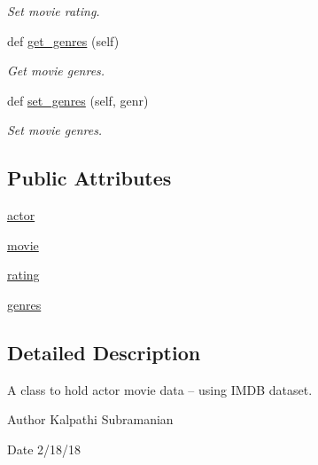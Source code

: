 \begin{DoxyCompactItemize}
\begin{DoxyCompactList}\small\item\em Set movie rating. \end{DoxyCompactList}\item 
def \hyperlink{class_bridges_1_1data__src__dependent_1_1_actor_movie_i_m_d_b_1_1_actor_movie_i_m_d_b_ad98818bbfe9d29c5c4f6ef63ccf4bbd8}{get\+\_\+genres} (self)
\begin{DoxyCompactList}\small\item\em Get movie genres. \end{DoxyCompactList}\item 
def \hyperlink{class_bridges_1_1data__src__dependent_1_1_actor_movie_i_m_d_b_1_1_actor_movie_i_m_d_b_a238451601df5b0072075f55c318e2a8d}{set\+\_\+genres} (self, genr)
\begin{DoxyCompactList}\small\item\em Set movie genres. \end{DoxyCompactList}\end{DoxyCompactItemize}
\subsection*{Public Attributes}
\begin{DoxyCompactItemize}
\item 
\hyperlink{class_bridges_1_1data__src__dependent_1_1_actor_movie_i_m_d_b_1_1_actor_movie_i_m_d_b_a84e73e799555925cb46d9db91724a93e}{actor}
\item 
\hyperlink{class_bridges_1_1data__src__dependent_1_1_actor_movie_i_m_d_b_1_1_actor_movie_i_m_d_b_a07aa8e1726948fa805165497eb9b4c8c}{movie}
\item 
\hyperlink{class_bridges_1_1data__src__dependent_1_1_actor_movie_i_m_d_b_1_1_actor_movie_i_m_d_b_aa6b0a5eefa9dd1d2e3734cebcad53773}{rating}
\item 
\hyperlink{class_bridges_1_1data__src__dependent_1_1_actor_movie_i_m_d_b_1_1_actor_movie_i_m_d_b_a9c781e2b62bd3bca8957795b54648c89}{genres}
\end{DoxyCompactItemize}


\subsection{Detailed Description}
A class to hold actor movie data -- using I\+M\+D\+B dataset. 

\begin{DoxyAuthor}{Author}
Kalpathi Subramanian 
\end{DoxyAuthor}
\begin{DoxyDate}{Date}
2/18/18 
\end{DoxyDate}


